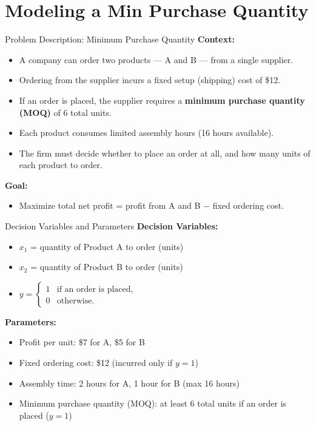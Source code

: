 \documentclass[aspectratio=169]{beamer}
\begin{document}
\section{Modeling a Min Purchase Quantity}
\begin{frame}\sectionpage\end{frame}

\begin{frame}{Problem Description: Minimum Purchase Quantity}
\textbf{Context:}
\begin{itemize}
  \item A company can order two products --- A and B --- from a single supplier.
  \item Ordering from the supplier incurs a fixed setup (shipping) cost of \$12.
  \item If an order is placed, the supplier requires a \textbf{minimum purchase quantity (MOQ)} of 6 total units.
  \item Each product consumes limited assembly hours (16 hours available).
  \item The firm must decide whether to place an order at all, and how many units of each product to order.
\end{itemize}

\textbf{Goal:}
\begin{itemize}
  \item Maximize total net profit = profit from A and B $-$ fixed ordering cost.
\end{itemize}
\end{frame}

\begin{frame}{Decision Variables and Parameters}
\textbf{Decision Variables:}
\begin{itemize}
  \item $x_1$ = quantity of Product A to order (units)
  \item $x_2$ = quantity of Product B to order (units)
  \item $y =
  \begin{cases}
  1 & \text{if an order is placed},\\
  0 & \text{otherwise}.
  \end{cases}$
\end{itemize}

\textbf{Parameters:}
\begin{itemize}
  \item Profit per unit: \$7 for A, \$5 for B
  \item Fixed ordering cost: \$12 (incurred only if $y=1$)
  \item Assembly time: 2 hours for A, 1 hour for B (max 16 hours)
  \item Minimum purchase quantity (MOQ): at least 6 total units if an order is placed ($y=1$)
\end{itemize}
\end{frame}
\end{document}

